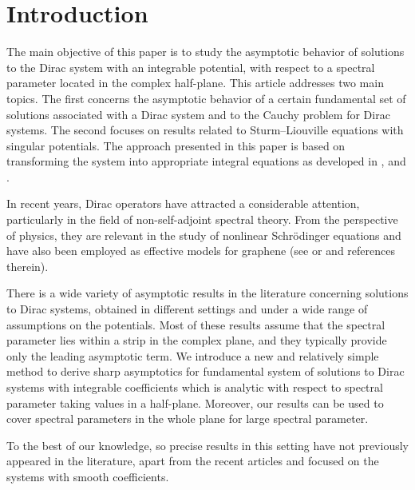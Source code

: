 \documentclass[11pt]{amsart}
\theoremstyle{plain}
\theoremstyle{definition}
\theoremstyle{remark}
\numberwithin{equation}{section}
\begin{document}
\maketitle

\section{Introduction}

The main objective of this paper is to study the asymptotic behavior of solutions to the Dirac system with an integrable potential, with respect to a spectral parameter located in the complex half-plane. This article addresses two main topics. The first concerns the asymptotic behavior of a certain fundamental set of solutions associated with a Dirac system and to the Cauchy problem for Dirac systems. The second focuses on results related to Sturm--Liouville equations with singular potentials.
The approach presented in this paper is based on transforming the system into appropriate integral equations
as developed in \cite{GPA}, \cite{SaKos} and \cite{Rzep25}.

In recent years, Dirac operators have attracted a considerable attention, particularly in the field of non-self-adjoint spectral theory. From the perspective of physics, they are relevant in the study of nonlinear Schr\"{o}dinger equations and have also been employed as effective models for graphene (see \cite{Siegl} or \cite{Korot14} and references therein).

There is a wide variety of asymptotic results in the literature concerning solutions to Dirac systems, obtained in different settings and under a wide range of assumptions on the potentials. Most of these results assume that the spectral parameter lies within a strip in the complex plane, and they typically provide only the leading asymptotic term. We introduce a new and relatively simple method to derive sharp asymptotics
for fundamental system of solutions to Dirac systems
with integrable coefficients which is analytic with respect to spectral parameter taking values in a half-plane. Moreover, our results can be used to cover spectral parameters in the whole plane for large spectral parameter.

To the best of our knowledge,
so precise results in this setting
have not previously appeared in the literature, apart from the recent articles \cite{SaKos21} and \cite{SaKos} focused
on the systems with smooth coefficients.
\end{document}
